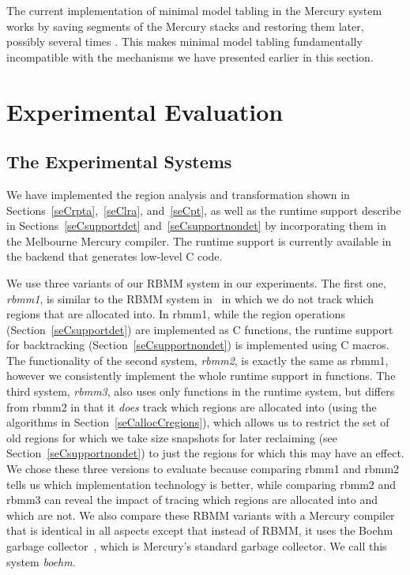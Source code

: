 \documentclass{tlp}
\begin{document}
The current implementation of minimal model tabling in the Mercury system
works by saving segments of the Mercury stacks and restoring them later,
possibly several times \cite{mercurytabling}.
This makes minimal model tabling fundamentally incompatible
with the mechanisms we have presented earlier in this section.

\section{Experimental Evaluation}
\label{seCexper}

\subsection{The Experimental Systems}
We have implemented the region analysis and transformation shown in
Sections~\ref{seCrpta},~\ref{seClra}, and~\ref{seCpt},
as well as the runtime support describe in
Sections~\ref{seCsupportdet} and~\ref{seCsupportnondet}
by incorporating them in the Melbourne Mercury compiler.
The runtime support is currently available
in the backend that generates low-level C code.

We use three variants of our RBMM system in our experiments.
The first one, \emph{rbmm1}, is
similar to the RBMM system in~\cite{Phan08ismm}
in which we do not track which regions that are allocated into.
In rbmm1, while the region operations (Section~\ref{seCsupportdet})
are implemented as C functions,
the runtime support for backtracking (Section~\ref{seCsupportnondet})
is implemented using C macros.
The functionality of the second system, \emph{rbmm2},
is exactly the same as rbmm1,
however we consistently implement the whole runtime support in functions.
The third system, \emph{rbmm3}, also uses only functions in the runtime system,
but differs from rbmm2 in that
it \emph{does} track which regions are allocated into
(using the algorithms in Section~\ref{seCallocCregions}),
which allows us to restrict the set of old regions
for which we take size snapshots for later reclaiming
(see Section~\ref{seCsupportnondet})
to just the regions for which this may have an effect.
We chose these three versions to evaluate
because comparing rbmm1 and rbmm2 tells us
which implementation technology is better,
while comparing rbmm2 and rbmm3 can reveal
the impact of tracing which regions are allocated into and which are not.
We also compare these RBMM variants with a Mercury compiler
that is identical in all aspects except that instead of RBMM,
it uses the Boehm garbage collector~\cite{Boehm88},
which is Mercury's standard garbage collector.
We call this system \emph{boehm}.
\end{document}
